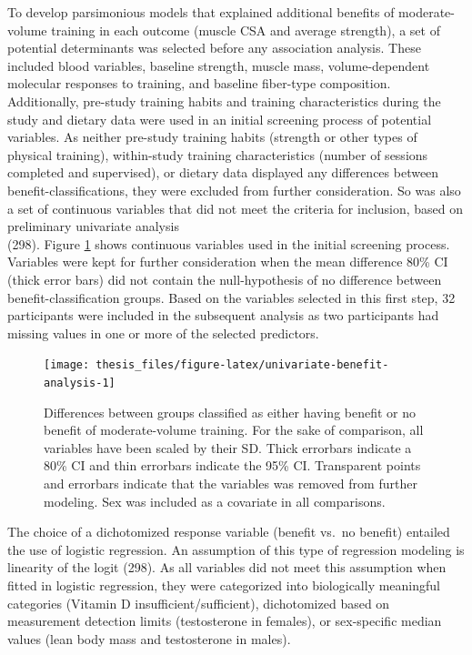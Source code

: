 \documentclass[twoside,10pt]{gihclass} %
\begin{document}
To develop parsimonious models that explained additional benefits of moderate-volume training in each outcome (muscle CSA and average strength), a set of potential determinants was selected before any association analysis. These included blood variables, baseline strength, muscle mass, volume-dependent molecular responses to training, and baseline fiber-type composition. Additionally, pre-study training habits and training characteristics during the study and dietary data were used in an initial screening process of potential variables. As neither pre-study training habits (strength or other types of physical training), within-study training characteristics (number of sessions completed and supervised), or dietary data displayed any differences between benefit-classifications, they were excluded from further consideration. So was also a set of continuous variables that did not meet the criteria for inclusion, based on preliminary univariate analysis\\
(298).
Figure \ref{fig:univariate-benefit-analysis} shows continuous variables used in the initial screening process. Variables were kept for further consideration when the mean difference 80\% CI (thick error bars) did not contain the null-hypothesis of no difference between benefit-classification groups. Based on the variables selected in this first step, 32 participants were included in the subsequent analysis as two participants had missing values in one or more of the selected predictors.
\begin{figure}

{\centering \texttt{[image: thesis\_files/figure-latex/univariate-benefit-analysis-1]} 

}

\caption[Univariate analysis of potential determinants of benefit to moderat- over low-volume training]{Differences between groups classified as either having benefit or no benefit of moderate-volume training. For the sake of comparison, all variables have been scaled by their SD. Thick errorbars indicate a 80\% CI and thin errorbars indicate the 95\% CI. Transparent points and errorbars indicate that the variables was removed from further modeling. Sex was included as a covariate in all comparisons.}\label{fig:univariate-benefit-analysis}
\end{figure}
The choice of a dichotomized response variable (benefit vs.~no benefit) entailed the use of logistic regression. An assumption of this type of regression modeling is linearity of the logit
(298).
As all variables did not meet this assumption when fitted in logistic regression, they were categorized into biologically meaningful categories (Vitamin D insufficient/sufficient), dichotomized based on measurement detection limits (testosterone in females), or sex-specific median values (lean body mass and testosterone in males).
\end{document}
